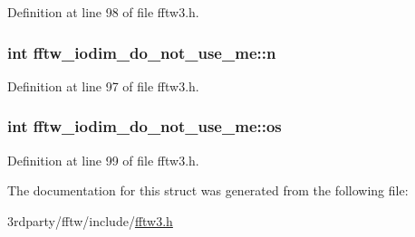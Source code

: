 \-Definition at line 98 of file fftw3.\-h.

\hypertarget{structfftw__iodim__do__not__use__me_aa9ceb61afc1731380bdb48305aa40ce0}{
\subsubsection[{n}]{\setlength{\rightskip}{0pt plus 5cm}int {\bf fftw\-\_\-iodim\-\_\-do\-\_\-not\-\_\-use\-\_\-me\-::n}}}\label{dd/df3/structfftw__iodim__do__not__use__me_aa9ceb61afc1731380bdb48305aa40ce0}


\-Definition at line 97 of file fftw3.\-h.

\hypertarget{structfftw__iodim__do__not__use__me_acff6a6b2225f610d3bee5380e801abb4}{
\subsubsection[{os}]{\setlength{\rightskip}{0pt plus 5cm}int {\bf fftw\-\_\-iodim\-\_\-do\-\_\-not\-\_\-use\-\_\-me\-::os}}}\label{dd/df3/structfftw__iodim__do__not__use__me_acff6a6b2225f610d3bee5380e801abb4}


\-Definition at line 99 of file fftw3.\-h.



\-The documentation for this struct was generated from the following file\-:\begin{DoxyCompactItemize}
\item 
3rdparty/fftw/include/\hyperlink{fftw3_8h}{fftw3.\-h}\end{DoxyCompactItemize}
